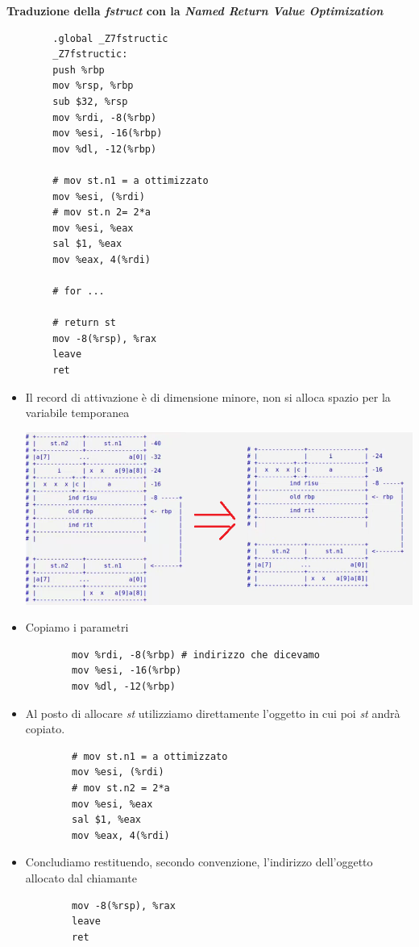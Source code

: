 \noindent \textbf{Traduzione della \emph{fstruct} con la \emph{Named Return Value Optimization}}
\begin{multicols}{2}
	\begin{verbatim}
		.global _Z7fstructic
		_Z7fstructic:
		push %rbp
		mov %rsp, %rbp
		sub $32, %rsp
		mov %rdi, -8(%rbp)
		mov %esi, -16(%rbp)
		mov %dl, -12(%rbp)
		
		# mov st.n1 = a ottimizzato
		mov %esi, (%rdi)
		# mov st.n 2= 2*a 
		mov %esi, %eax
		sal $1, %eax
		mov %eax, 4(%rdi)
		
		# for ...
		
		# return st
		mov -8(%rsp), %rax
		leave
		ret
	\end{verbatim}
\end{multicols}
\small
\begin{itemize}
	\item Il record di attivazione è di dimensione minore, non si alloca spazio per la variabile temporanea \begin{center}
		\includegraphics[scale=0.86]{img/45.PNG}
	\end{center}  
	\item Copiamo i parametri
	\begin{verbatim}
		mov %rdi, -8(%rbp) # indirizzo che dicevamo
		mov %esi, -16(%rbp) 
		mov %dl, -12(%rbp)
	\end{verbatim}
	\item Al posto di allocare \emph{st} utilizziamo direttamente l'oggetto in cui poi \emph{st} andrà copiato. 
	\begin{verbatim}
		# mov st.n1 = a ottimizzato
		mov %esi, (%rdi)
		# mov st.n2 = 2*a 
		mov %esi, %eax
		sal $1, %eax
		mov %eax, 4(%rdi)
	\end{verbatim}
	\item Concludiamo restituendo, secondo convenzione, l'indirizzo dell'oggetto allocato dal chiamante
	\begin{verbatim}
		mov -8(%rsp), %rax
		leave
		ret
	\end{verbatim}
\end{itemize}
\normalsize 